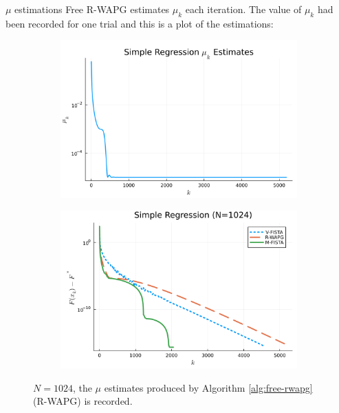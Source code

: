 \documentclass[11pt]{beamer}
\theoremstyle{definition}
\begin{document}
    \begin{frame}{$\mu$ estimations}
        Free R-WAPG estimates $\mu_k$ each iteration. 
        The value of $\mu_k$ had been recorded for one trial and this is a plot of the estimations: 
        \begin{figure}[H]
            \centering
            \begin{subfigure}[b]{0.47\textwidth}
                \centering
                \includegraphics[width=\textwidth]{assets/simple_regression_loss_sc_estimates_1024.png}
            \end{subfigure}
            \hfill
            \begin{subfigure}[b]{0.47\textwidth}
                \centering
                \includegraphics[width=\textwidth]{assets/simple_regression_loss_1024.png}
            \end{subfigure}
            \caption{
                $N = 1024$, the $\mu$ estimates produced by Algorithm \ref{alg:free-rwapg} (R-WAPG) is recorded.
            }
            \label{fig:simple-quadratic-r-wapg-mu-estimates}
        \end{figure}
    \end{frame}
\end{document}
